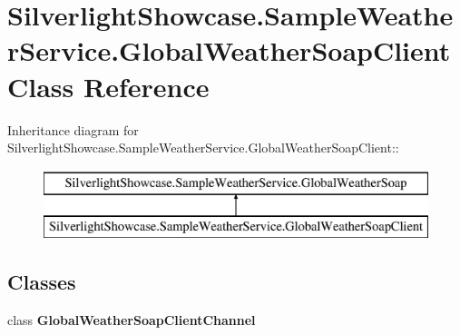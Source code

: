 \hypertarget{class_silverlight_showcase_1_1_sample_weather_service_1_1_global_weather_soap_client}{
\section{SilverlightShowcase.SampleWeatherService.GlobalWeatherSoapClient Class Reference}
\label{class_silverlight_showcase_1_1_sample_weather_service_1_1_global_weather_soap_client}
}
Inheritance diagram for SilverlightShowcase.SampleWeatherService.GlobalWeatherSoapClient::\begin{figure}[H]
\begin{center}
\leavevmode
\includegraphics[height=2cm]{class_silverlight_showcase_1_1_sample_weather_service_1_1_global_weather_soap_client}
\end{center}
\end{figure}
\subsection*{Classes}
\begin{DoxyCompactItemize}
\item 
class {\bfseries GlobalWeatherSoapClientChannel}
\end{DoxyCompactItemize}
